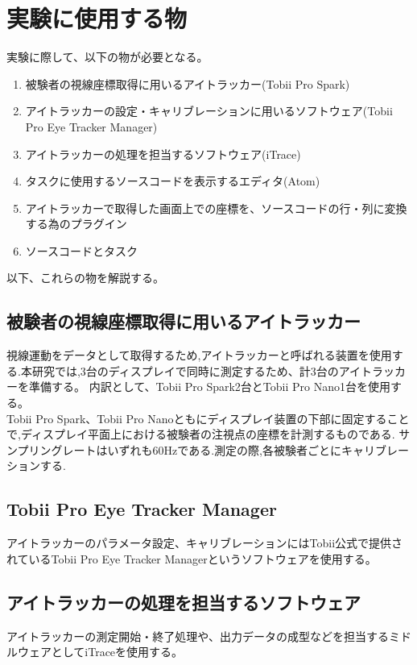 \documentclass[paper=a4paper,fontsize=10pt]{jlreq}
\begin{document}
  \section{実験に使用する物}
    実験に際して、以下の物が必要となる。
    \begin{enumerate}
      \item 被験者の視線座標取得に用いるアイトラッカー(Tobii Pro Spark)
      \item アイトラッカーの設定・キャリブレーションに用いるソフトウェア(Tobii Pro Eye Tracker Manager)
      \item アイトラッカーの処理を担当するソフトウェア(iTrace)
      \item タスクに使用するソースコードを表示するエディタ(Atom)
      \item アイトラッカーで取得した画面上での座標を、ソースコードの行・列に変換する為のプラグイン
      \item ソースコードとタスク
    \end{enumerate}
    以下、これらの物を解説する。

    \subsection{被験者の視線座標取得に用いるアイトラッカー}
      視線運動をデータとして取得するため,アイトラッカーと呼ばれる装置を使用する.本研究では,3台のディスプレイで同時に測定するため、計3台のアイトラッカーを準備する。
      内訳として、Tobii Pro Spark\cite{spark}2台とTobii Pro Nano\cite{nano}1台を使用する。
      \\
      Tobii Pro Spark、Tobii Pro Nanoともにディスプレイ装置の下部に固定することで,ディスプレイ平面上における被験者の注視点の座標を計測するものである.
      サンプリングレートはいずれも60Hzである.測定の際,各被験者ごとにキャリブレーションする.

    \subsection{Tobii Pro Eye Tracker Manager}
      アイトラッカーのパラメータ設定、キャリブレーションにはTobii公式で提供されているTobii Pro Eye Tracker Managerというソフトウェアを使用する。
    
    \subsection{アイトラッカーの処理を担当するソフトウェア}
      アイトラッカーの測定開始・終了処理や、出力データの成型などを担当するミドルウェアとしてiTrace\cite{itrace}を使用する。
\end{document}
